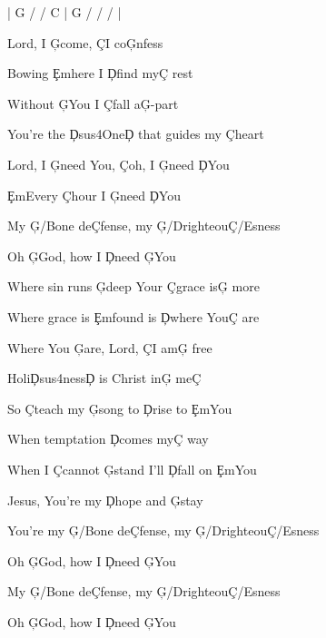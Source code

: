 \documentclass[9pt]{extarticle}
\begin{document}
\bsong

\bi
|  G / / C  |  G / / /  |
\ei

\bv
Lord, I \c{G}come, \c{C}I co\c{G}nfess

Bowing \c{Em}here I \c{D}find my\c{C} rest

Without \c{G}You I \c{C}fall a\c{G}-part

You're the \c{Dsus4}One\c{D} that guides my \c{C}heart
\ev

\bc
Lord, I \c{G}need You, \c{C}oh, I \c{G}need \c{D}You

\c{Em}Every \c{C}hour I \c{G}need \c{D}You

My \c{G/B}one de\c{C}fense, my \c{G/D}righteou\c{C/E}sness

Oh \c{G}God, how I \c{D}need \c{G}You
\ec

\bv
Where sin runs \c{G}deep Your \c{C}grace is\c{G} more

Where grace is \c{Em}found is \c{D}where You\c{C} are

Where You \c{G}are, Lord, \c{C}I am\c{G} free

Holi\c{Dsus4}ness\c{D} is Christ in\c{G} me\c{C}
\ev


\bb
So \c{C}teach my \c{G}song to \c{D}rise to \c{Em}You

When temptation \c{D}comes my\c{C} way

When I \c{C}cannot \c{G}stand I'll \c{D}fall on \c{Em}You

Jesus, You're my \c{D}hope and \c{G}stay
\eb


\bo
You're my \c{G/B}one de\c{C}fense, my \c{G/D}righteou\c{C/E}sness

Oh \c{G}God, how I \c{D}need \c{G}You

My \c{G/B}one de\c{C}fense, my \c{G/D}righteou\c{C/E}sness

Oh \c{G}God, how I \c{D}need \c{G}You
\eo

\esong
\end{document}
